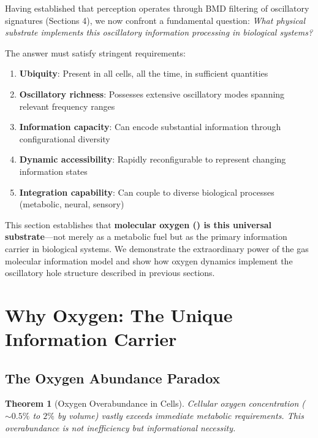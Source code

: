\documentclass[12pt,a4paper]{article}
\newtheorem{theorem}{Theorem}
\begin{document}
Having established that perception operates through BMD filtering of oscillatory signatures (Sections 4), we now confront a fundamental question: \textit{What physical substrate implements this oscillatory information processing in biological systems?}

The answer must satisfy stringent requirements:
\begin{enumerate}
\item \textbf{Ubiquity}: Present in all cells, all the time, in sufficient quantities
\item \textbf{Oscillatory richness}: Possesses extensive oscillatory modes spanning relevant frequency ranges
\item \textbf{Information capacity}: Can encode substantial information through configurational diversity
\item \textbf{Dynamic accessibility}: Rapidly reconfigurable to represent changing information states
\item \textbf{Integration capability}: Can couple to diverse biological processes (metabolic, neural, sensory)
\end{enumerate}

This section establishes that \textbf{molecular oxygen () is this universal substrate}—not merely as a metabolic fuel but as the primary information carrier in biological systems. We demonstrate the extraordinary power of the gas molecular information model and show how oxygen dynamics implement the oscillatory hole structure described in previous sections.

\section{Why Oxygen: The Unique Information Carrier}

\subsection{The Oxygen Abundance Paradox}

\begin{theorem}[Oxygen Overabundance in Cells]
\label{thm:oxygen_overabundance}
Cellular oxygen concentration ($\sim 0.5\%$ to $2\%$ by volume) vastly exceeds immediate metabolic requirements. This overabundance is not inefficiency but informational necessity.
\end{theorem}
\end{document}
